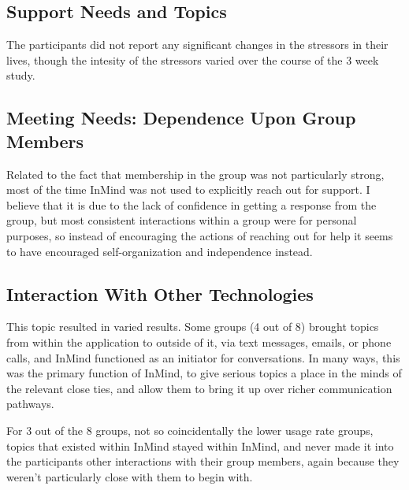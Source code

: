   \subsection{Support Needs and Topics}
    The participants did not report any significant changes in the stressors
    in their lives,
    though the intesity of the stressors varied over the course of the 3 week study.
  
  \subsection{Meeting Needs: Dependence Upon Group Members}
    Related to the fact that membership in the group was not particularly strong,
    most of the time InMind was not used to explicitly reach out for support.
    I believe that it is due to the lack of confidence in getting a response
    from the group,
    but most consistent interactions within a group were for personal purposes,
    so instead of encouraging the actions of reaching out for help
    it seems to have encouraged self-organization and independence instead.

  \subsection{Interaction With Other Technologies}
    This topic resulted in varied results.
    Some groups (4 out of 8) brought topics from within the application to outside
    of it, via text messages, emails, or phone calls,
    and InMind functioned as an initiator for conversations.
    In many ways, this was the primary function of InMind,
    to give serious topics a place in the minds of the relevant close ties,
    and allow them to bring it up over richer communication pathways.

    For 3 out of the 8 groups, not so coincidentally the lower usage rate groups,
    topics that existed within InMind stayed within InMind,
    and never made it into the participants other interactions with their group
    members, again because they weren't particularly close with them to begin with.

